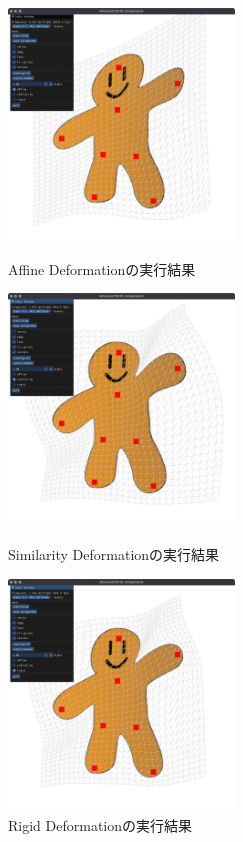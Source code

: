 \documentclass[a4paper,10pt,uplatex,dvipdfmx]{jsarticle}
\begin{document}
\begin{figure}[H]
  \centering
  \includegraphics[width=6cm]{./img/affine.png}
  \caption{Affine Deformationの実行結果}

  \vspace{5mm}

  \centering
  \includegraphics[width=6cm]{./img/similarity.png}
  \caption{Similarity Deformationの実行結果}

  \vspace{5mm}

  \centering
  \includegraphics[width=6cm]{./img/rigid.png}
  \caption{Rigid Deformationの実行結果}
\end{figure}
\end{document}
